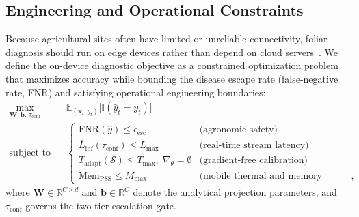 \subsection{Engineering and Operational Constraints}
\label{sec:engineering_constraints}
Because agricultural sites often have limited or unreliable connectivity, foliar diagnosis should run on edge devices rather than depend on cloud servers~\cite{radocaj2025evolution,sharif2026real}. We define the on-device diagnostic objective as a constrained optimization problem that maximizes accuracy while bounding the disease escape rate (false-negative rate, FNR) and satisfying operational engineering boundaries:
\begin{equation}
\begin{aligned}
    \max_{\mathbf{W}, \mathbf{b}, \, \tau_{\text{conf}}} \quad & \mathbb{E}_{(\mathbf{x}_t, y_t)}\big[\mathbb{I}(\hat{y}_t = y_t)\big] \\
    \text{subject to} \quad & \begin{cases}
        \text{FNR}(\hat{y}) \le \epsilon_{\text{esc}} & \text{(agronomic safety)} \\
        \overline{L}_{\text{inf}}(\tau_{\text{conf}}) \le L_{\max} & \text{(real-time stream latency)} \\
        T_{\text{adapt}}(\mathcal{S}) \le T_{\max}, \; \nabla_\theta = \emptyset & \text{(gradient-free calibration)} \\
        \text{Mem}_{\text{PSS}} \le M_{\max} & \text{(mobile thermal and memory budget)},
    \end{cases}
\end{aligned}
\label{eq:constrained_objective}
\end{equation}
where $\mathbf{W} \in \mathbb{R}^{C \times d}$ and $\mathbf{b} \in \mathbb{R}^C$ denote the analytical projection parameters, and $\tau_{\text{conf}}$ governs the two-tier escalation gate.

